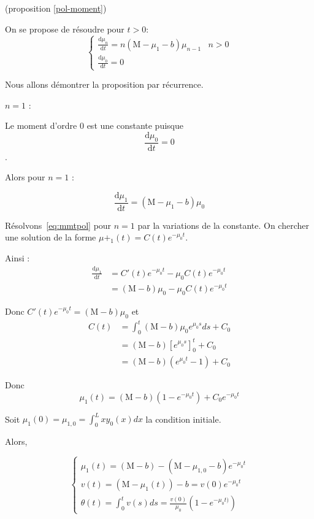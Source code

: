 \documentclass[a4paper]{article}
\newcommand{\mass}{\mathrm{M}}
\newcommand{\dep}{b}
\begin{document}
\begin{preuve}
	(proposition \ref{pol-moment})
	
	On se propose de résoudre pour $t>0$:
	\begin{equation}
		\label{eq:mmtpol}
	\begin{cases}
	\displaystyle \frac{\mathrm{d} \mu_n }{\mathrm{d}t} = n(\mass - \mu_1-\dep) \mu_{n-1} & n>0 \\
	\displaystyle \frac{\mathrm{d} \mu_0 }{\mathrm{d}t} = 0
	\end{cases}
	\end{equation}
	
	Nous allons démontrer la proposition par récurrence. 

	\underline{$n=1$} :
	
	Le moment d'ordre 0 est une constante puisque 
	\[\frac{\mathrm{d} \mu_0 }{\mathrm{d}t} = 0\].
	
	Alors pour $n=1$ :
	
	\[\frac{\mathrm{d} \mu_1 }{\mathrm{d}t} = (\mass - \mu_1-\dep) \mu_{0}\]
	
	Résolvons~\eqref{eq:mmtpol} pour $n=1$ par la variations de la constante. 
	On chercher une solution de la forme $\mu+_1(t) = C(t) e^{-\mu_0 t}$.
	
	Ainsi :
	\[
	\begin{split}
		\frac{\mathrm{d} \mu_1 }{\mathrm{d}t} &= C'(t)e^{-\mu_0 t} - \mu_0 C(t)e^{-\mu_0 t} \\
		                                      &= (\mass-\dep) \mu_{0} - \mu_{0} C(t)e^{-\mu_0 t}
	\end{split}
	\]
	
	Donc $C'(t)e^{-\mu_0 t} = (\mass-\dep) \mu_{0} $ et 
	\[
	\begin{split} 
	C(t) &= \int_0^t (\mass-\dep) \mu_{0} e^{\mu_0 s}ds + C_0 \\
	     &= (\mass-\dep)[e^{\mu_0 s}]_0^t + C_0 \\
		 &= (\mass-\dep)(e^{\mu_0 t}-1) + C_0
	\end{split}
	\]
	
	Donc
	 \[ \mu_1 (t) = (\mass - \dep)(1-e^{- \mu_0 t})+C_0 e^{- \mu_0 t} \]
	 
	 Soit $\mu_1(0) = \mu_{1,0} = \int_0^L xy_0(x)dx $ la condition initiale.
	 
	 
	 Alors,

	\begin{equation}
		\begin{cases}
			\mu_1 (t) = (\mass - \dep) - ( \mass - \mu_{1,0} - \dep )e^{- \mu_0 t} \\
			v(t) = ( \mass - \mu_1 (t)) - \dep = v(0)e^{- \mu_0 t}\\
			\theta (t) =  \int_{0}^t v(s)ds = \frac{v(0)}{ \mu_0} (1-e^{-\mu_0 t)})
		\end{cases}
	\end{equation}
	

\end{preuve}
\end{document}
